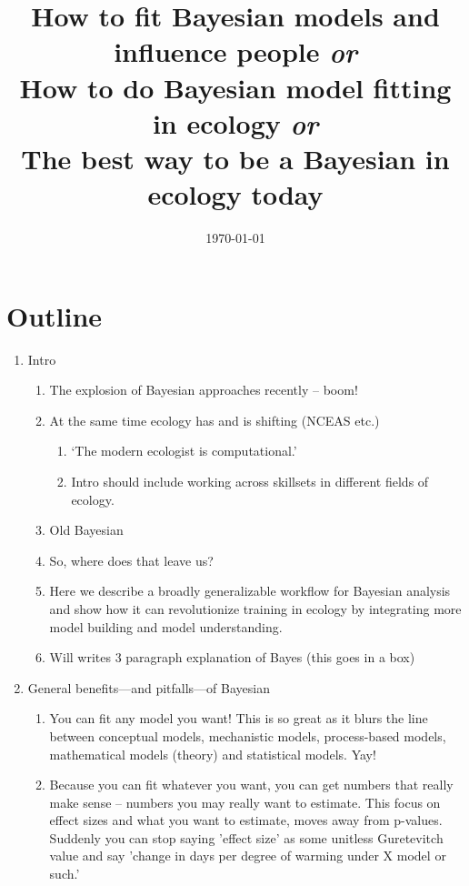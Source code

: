 \documentclass[11pt]{article}
\begin{document}

\renewcommand{\refname}{\CHead{}}

\title{How to fit Bayesian models and influence people \emph{or}\\
How to do Bayesian model fitting in ecology \emph{or}\\
The best way to be a Bayesian in ecology today}
\date{\today}
\maketitle

\section{Outline}

\begin{enumerate}
\item Intro 
\begin{enumerate}
\item The explosion of Bayesian approaches recently -- boom!
\item At the same time ecology has and is shifting (NCEAS etc.)
\begin{enumerate}
\item `The modern ecologist is computational.' 
\item Intro should include working across skillsets in different fields of ecology.
\end{enumerate}
\item Old Bayesian
\item So, where does that leave us?
\item Here we describe a broadly generalizable workflow for Bayesian analysis and show how it can revolutionize training in ecology by integrating more model building and model understanding. 
\item Will writes 3 paragraph explanation of Bayes (this goes in a box)
\end{enumerate}
\item General benefits---and pitfalls---of Bayesian 
\begin{enumerate}
\item You can fit any model you want! This is so great as it blurs the line between conceptual models, mechanistic models, process-based models, mathematical models (theory) and statistical models. Yay!
\item Because you can fit whatever you want, you can get numbers that really make sense -- numbers you may really want to estimate. This focus on effect sizes and what you want to estimate, moves away from p-values. Suddenly you can stop saying 'effect size' as some unitless Guretevitch value and say 'change in days per degree of warming under X model or such.' 

\end{enumerate}
\end{enumerate}
\end{document}
